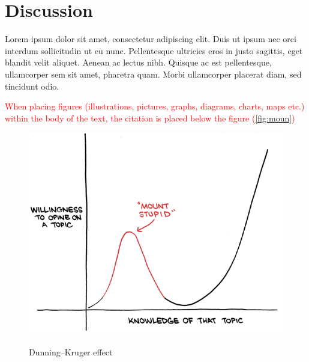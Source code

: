 \vfill

\newpage 

\section{Discussion}
Lorem ipsum dolor sit amet, consectetur adipiscing elit. Duis ut ipsum nec orci interdum sollicitudin ut eu nunc. Pellentesque ultricies eros in justo sagittis, eget blandit velit aliquet. Aenean ac lectus nibh. Quisque ac est pellentesque, ullamcorper sem sit amet, pharetra quam. Morbi ullamcorper placerat diam, sed tincidunt odio.

\textcolor{red}{When placing figures (illustrations, pictures, graphs, diagrams, charts, maps etc.) within the body of the text, the citation is placed below the figure (\autoref{fig:moun})}

\begin{figure}[!h]
  \centering
  \includegraphics [scale=0.5]{images/dunning_kruger.png} \\
  {\small {\it \caption{Dunning–Kruger effect \label{fig:moun} }}}
\end{figure}
